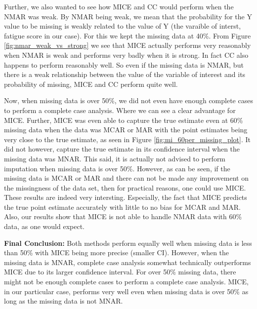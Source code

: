 \documentclass[fleqn,10pt]{wlscirep}\usepackage[]{graphicx}\usepackage[]{color}
\begin{document}
Further, we also wanted to see how MICE and CC would perform when the NMAR was weak. By NMAR being weak, we mean that the probability for the Y value to be missing is weakly related to the value of Y (the varaible of interst, fatigue score in our case). For this we kept the missing data at 40\%. From Figure \ref{fig:nmar_weak_vs_strong} we see that MICE actually performs very reasonably when NMAR is weak and performs very badly when it is strong. In fact CC also happens to perform reasonably well. So even if the missing data is NMAR, but there is a weak relationship between the value of the variable of interest and its probability of missing, MICE and CC perform quite well. 

Now, when missing data is over 50\%, we did not even have enough complete cases to perform a complete case analysis. Where we can see a clear advantage for MICE. Further, MICE was even able to capture the true estimate even at 60\% missing data when the data was MCAR or MAR with the point estimates being very close to the true estimate, as seen in Figure \ref{fig:mi_60per_missing_plot}. It did not however, capture the true estimate in its confidence interval when the missing data was MNAR. This said, it is actually not advised to perform imputation when missing data is over 50\%. However, as can be seen, if the missing data is MCAR or MAR and there can not be made any improvement on the missingness of the data set, then for practical reasons, one could use MICE. These results are indeed very intersting. Especially, the fact that MICE predicts the true point estimate accurately with little to no bias for MCAR and MAR. Also, our results show that MICE is not able to handle NMAR data with 60\% data, as one would expect.


\textbf{Final Conclusion:} Both methods perform equally well when missing data is less than 50\% with MICE being more precise (smaller CI). However, when the missing data is MNAR, complete case analysis somewhat technically outperforms MICE due to its larger confidence interval. For over 50\% missing data, there might not be enough complete cases to perform a complete case analysis. MICE, in our particular case, performs very well even when missing data is over 50\% as long as the missing data is not MNAR. 




\end{document}
